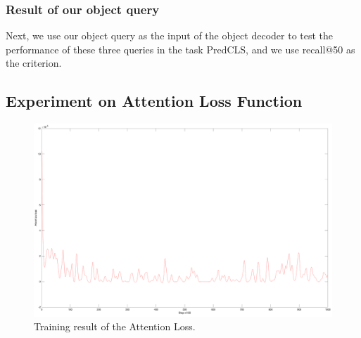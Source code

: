 \subsubsection{Result of our object query}
Next, we use our object query as the input of the object decoder to test the performance of these three queries in the task PredCLS, and we use recall@50 as the criterion.


\subsection{Experiment on Attention  Loss Function}

\begin{figure}[tbph!]
	\centering
	\includegraphics[width=0.9\linewidth]{figures/result/attention_loss}
	\caption[Training result of the Attention Loss]{Training result of the Attention Loss.}
	\label{fig:attention_loss_result}
\end{figure}



